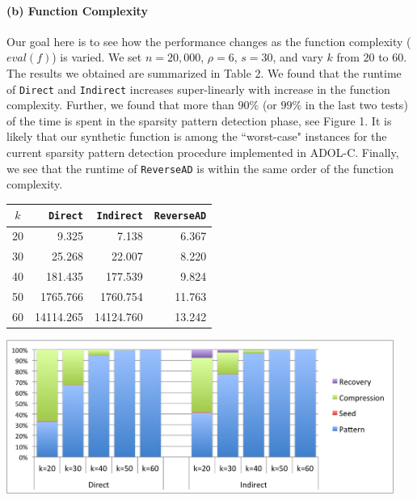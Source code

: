\documentclass[10pt, a4paper, english]{article}
\begin{document}
\paragraph{(b) Function Complexity} 
Our goal here is to see how the performance changes as the function complexity ($eval(f)$) 
is varied. We set $n = 20,000$, $\rho = 6$, $s = 30$, and vary $k$ from $20$ to $60$. 
The results we obtained are summarized in Table 2.
We found that the runtime of {\tt Direct} and {\tt Indirect} increases super-linearly with increase in the function complexity. Further, we found that more than $90\%$ (or $99\%$ in the last two tests) of the time is spent in the sparsity pattern detection phase, see Figure 1. It is likely that our synthetic function is among the ``worst-case" instances for the current sparsity pattern detection procedure implemented in ADOL-C.  Finally, we see that the runtime of {\tt ReverseAD} is within the same order of the function complexity.

\vspace{0.2cm}

\begin{minipage}{\textwidth}
  \begin{minipage}[b]{0.45\textwidth}
    \centering
\begin{tabular}{|c|r|r|r|}
\hline
$k$ & {\tt Direct} & {\tt Indirect} & {\tt ReverseAD} \\
\hline
20 & 9.325 & 7.138 & 6.367 \\
30 & 25.268 & 22.007 & 8.220\\
40 & 181.435 & 177.539 & 9.824\\
50 & 1765.766 & 1760.754 & 11.763 \\
60 & 14114.265 & 14124.760 & 13.242\\
\hline
\end{tabular}
\end{minipage}
\begin{minipage}[b]{0.06\textwidth}
\phantom{b}
\end{minipage}
  \begin{minipage}[b]{0.45\textwidth}
    \centering
    \includegraphics[width=0.95\textwidth]{figures/pb}
  \end{minipage}
  \hfill
\end{minipage}
\end{document}
